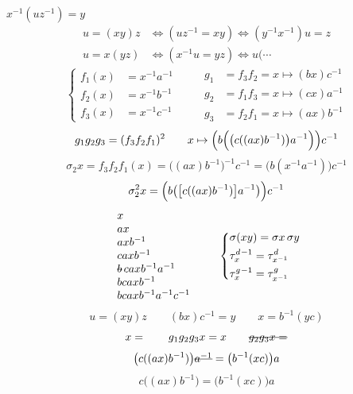 \documentclass[11pt,a4paper]{article}
\begin{document}
 \qquad $x^{-1}(uz^{-1})=y$
\[
  \begin{aligned}
    u=(xy)z &\Longleftrightarrow (uz^{-1}=xy)\Longleftrightarrow (y^{-1}x^{-1})u=z\\
    u=x(yz) &\Longleftrightarrow (x^{-1}u=yz)\Longleftrightarrow u(\cdots
  \end{aligned}
\]
\[
  \left\{
  \begin{aligned}
    f_1(x)&=x^{-1}a^{-1}\\ f_2(x)&=x^{-1}b^{-1}\\ f_3(x)&=x^{-1}c^{-1}
  \end{aligned}
  \right.
  \qquad
  \begin{aligned}
    g_1&=f_3f_2 = x\mapsto (bx)c^{-1}\\
    g_2&=f_1f_3 = x\mapsto (cx)a^{-1}\\
    g_3&=f_2f_1 = x\mapsto (ax)b^{-1}
  \end{aligned}
\]
\[
  g_1g_2g_3=(f_3f_2f_1)^2\qquad x\mapsto \Bigl(b\Bigl(\bigl(c((ax)b^{-1})\bigr)a^{-1}\Bigr)\Bigr)c^{-1}
\]
\[
  \sigma_2x=f_3f_2f_1(x)=\bigl((ax)b^{-1}\bigr)^{-1}c^{-1}=\bigl(b(x^{-1}a^{-1})\bigr)c^{-1}
\]
\[
  \sigma_2^2x=\Bigl(b\bigl(\bigl[c((ax)b^{-1})\bigr]a^{-1}\bigr)\Bigr)c^{-1}
\]
\[
  \begin{array}{l}
    x\\ ax\\ axb^{-1}\\ caxb^{-1}\\ \text{\struck{$b$}}\,caxb^{-1}a^{-1}\\ bcaxb^{-1}\\ bcaxb^{-1}a^{-1}c^{-1}
  \end{array}
  \qquad
  \left\{
  \begin{aligned}
    &\sigma(xy)=\sigma x\,\sigma y\\
    &\tau^{d}_{x}{}^{-1}=\tau^{d}_{x^{-1}}\\
    &\tau^{g}_{x}{}^{-1}=\tau^{g}_{x^{-1}}
  \end{aligned}
  \right.
\]
\[
  u=(xy)z\qquad (bx)c^{-1}=y\qquad x=b^{-1}(yc)
\]
\[
  x=\qquad g_1g_2g_3x=x\qquad \text{\struck{$g_2g_3x=$}}
\]
\[
  \bigl(c((ax)b^{-1})\bigr)\text{\struck{$a^{-1}$}}=\bigl(b^{-1}(xc)\bigr)a
\]
\[
  \boxed{c\bigl((ax)b^{-1}\bigr)=\bigl(b^{-1}(xc)\bigr)a}
\]
 
\end{document}
